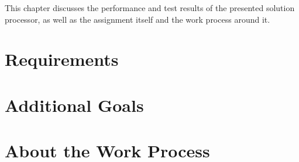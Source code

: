 This chapter discusses the performance and test results of the presented solution processor, as well as the assignment itself and the work process around it.

\section{Requirements}


\section{Additional Goals}


\section{About the Work Process}

